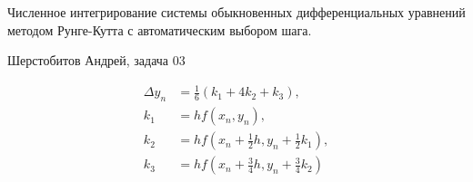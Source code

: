 \documentclass[12pt]{article}
\begin{document}
\begin{center}
Численное интегрирование системы обыкновенных дифференциальных уравнений
методом Рунге-Кутта с автоматическим выбором шага.
\end{center}
\begin{center}
Шерстобитов Андрей, задача 03
\end{center}

\begin{align*}
    \Delta y_n&=\frac{1}{6}(k_1+4k_2+k_3), \\
    k_1 &= hf(x_n, y_n), \\
    k_2 &= hf(x_n+\frac{1}{2}h,y_n+\frac{1}{2}k_1), \\
    k_3 &= hf(x_n+\frac{3}{4}h,y_n+\frac{3}{4}k_2)
\end{align*}
\end{document}
